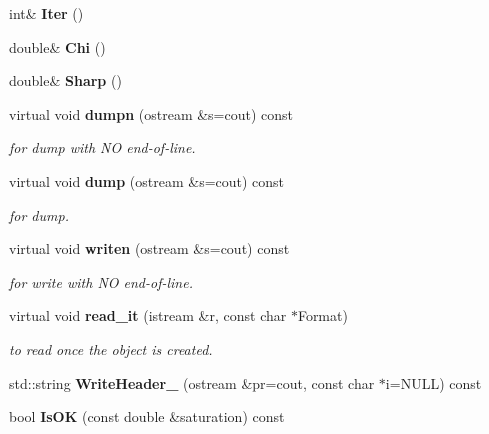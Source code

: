 \begin{CompactItemize}
\item 
{}
int\& {\bf Iter} ()\label{class_sestar_a71}

\item 
{}
double\& {\bf Chi} ()\label{class_sestar_a72}

\item 
{}
double\& {\bf Sharp} ()\label{class_sestar_a73}

\item 
{}
virtual void {\bf dumpn} (ostream \&s=cout) const\label{class_sestar_a74}

\begin{CompactList}\small\item\em for dump with NO end-of-line.\item\end{CompactList}\item 
{}
virtual void {\bf dump} (ostream \&s=cout) const\label{class_sestar_a75}

\begin{CompactList}\small\item\em for dump.\item\end{CompactList}\item 
{}
virtual void {\bf writen} (ostream \&s=cout) const\label{class_sestar_a76}

\begin{CompactList}\small\item\em for write with NO end-of-line.\item\end{CompactList}\item 
{}
virtual void {\bf read\_\-it} (istream \&r, const char $\ast$Format)\label{class_sestar_a77}

\begin{CompactList}\small\item\em to read once the object is created.\item\end{CompactList}\item 
{}
std::string {\bf Write\-Header\_\-} (ostream \&pr=cout, const char $\ast$i=NULL) const\label{class_sestar_a78}

\item 
{}
bool {\bf Is\-OK} (const double \&saturation) const\label{class_sestar_a79}

\end{CompactItemize}
